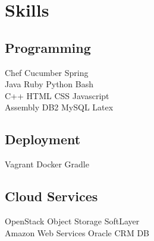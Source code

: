 \documentclass[letterpaper]{resume} %
\begin{document}
\begin{minipage}[t]{0.33\textwidth}
\sectionspace %


\section{Skills}

\subsection{Programming}

Chef \textbullet{} Cucumber \textbullet{} Spring \\
\sectionspace
{}
Java \textbullet{} Ruby \textbullet{} Python \textbullet{} Bash \\
C++ \textbullet{} HTML \textbullet{} CSS  \textbullet{} Javascript \\
\sectionspace
{}
Assembly \textbullet{} DB2 \textbullet{} MySQL \textbullet{} Latex

\sectionspace

\subsection{Deployment}
Vagrant \textbullet{} Docker \textbullet{} Gradle\\ 

\sectionspace %

\subsection{Cloud Services}
OpenStack Object Storage
\textbullet{} SoftLayer \\
Amazon Web Services
\textbullet{} Oracle CRM DB




\end{minipage} %
\hfill
%
%
\end{document}

